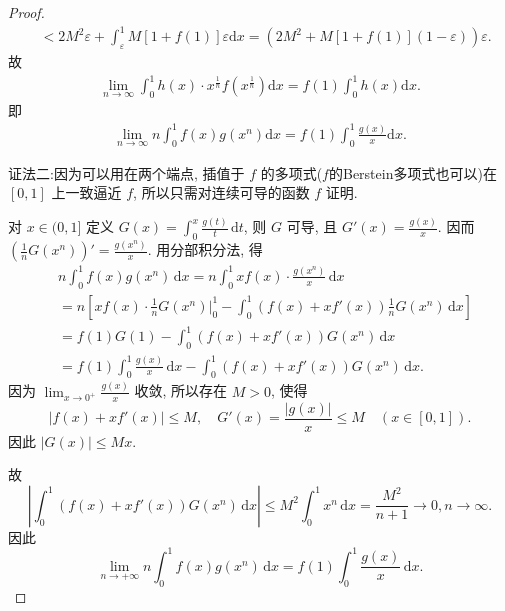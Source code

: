 \documentclass[../../main.tex]{subfiles}%
\begin{document}
\begin{proof}
\begin{align*}
&<2M^2\varepsilon+\int_{\varepsilon}^1 M\left[1+f(1)\right]\varepsilon\mathrm{d}x=\left(2M^2+M\left[1+f(1)\right]\left(1-\varepsilon\right)\right)\varepsilon.
\end{align*}
故
\begin{align*}
\lim\limits_{n\rightarrow \infty}\int_0^1 h(x)\cdot x^{\frac{1}{n}}f\left(x^{\frac{1}{n}}\right)\mathrm{d}x=f(1)\int_0^1 h(x)\mathrm{d}x.
\end{align*}
即
\begin{align*}
\lim_{n\rightarrow \infty}n\int_0^1 f(x)g(x^n)\mathrm{d}x=f(1)\int_0^1 \frac{g(x)}{x}\mathrm{d}x.
\end{align*}

{\color{blue}证法二:}因为可以用在两个端点, 插值于 \( f \) 的多项式($f$的Berstein多项式也可以)在 \([0,1]\) 上一致逼近 \( f \), 所以只需对连续可导的函数 \( f \) 证明.

对 \( x \in (0,1] \) 定义 \( G(x) = \int_{0}^{x} \frac{g(t)}{t} \, \mathrm{d}t \), 则 \( G \) 可导, 且 \( G'(x) = \frac{g(x)}{x} \). 因而 \( \left( \frac{1}{n} G(x^n) \right)' = \frac{g(x^n)}{x} \). 用分部积分法, 得
\[
\begin{aligned}
&n \int_{0}^{1} f(x) g(x^n) \, \mathrm{d}x = n \int_{0}^{1} x f(x) \cdot \frac{g(x^n)}{x} \, \mathrm{d}x \\
&= n \left[ x f(x) \cdot \frac{1}{n} G(x^n) \bigg|_{0}^{1} - \int_{0}^{1} \left( f(x) + x f'(x) \right) \frac{1}{n} G(x^n) \, \mathrm{d}x \right] \\
&= f(1) G(1) - \int_{0}^{1} \left( f(x) + x f'(x) \right) G(x^n) \, \mathrm{d}x \\
&= f(1) \int_{0}^{1} \frac{g(x)}{x} \, \mathrm{d}x - \int_{0}^{1} \left( f(x) + x f'(x) \right) G(x^n) \, \mathrm{d}x.
\end{aligned}
\]
因为 \( \lim_{x \to 0^+} \frac{g(x)}{x} \) 收敛, 所以存在 \( M > 0 \), 使得
\[
|f(x) + x f'(x)| \leqslant M, \quad G'(x)=\frac{|g(x)|}{x} \leqslant M \quad (x \in [0,1]).
\]
因此 \( |G(x)| \leqslant M x \).

故
\[
\left| \int_{0}^{1} \left( f(x) + x f'(x) \right) G(x^n) \, \mathrm{d}x \right| \leqslant M^2 \int_{0}^{1} x^n \, \mathrm{d}x = \frac{M^2}{n + 1}\to 0,n\to \infty.
\]
因此
\[
\lim_{n \to +\infty} n \int_{0}^{1} f(x) g(x^n) \, \mathrm{d}x = f(1) \int_{0}^{1} \frac{g(x)}{x} \, \mathrm{d}x.
\]
\end{proof}
\end{document}
